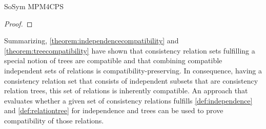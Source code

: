 \begin{copiedFrom}{SoSym MPM4CPS}
\begin{proof}
\end{proof}

Summarizing, \autoref{theorem:independencecompatibility} and \autoref{theorem:treecompatibility} have shown that consistency relation sets fulfilling a special notion of trees are compatible and that combining compatible independent sets of relations is compatibility-preserving.
In consequence, having a consistency relation set that consists of independent subsets that are consistency relation trees, this set of relations is inherently compatible.
An approach that evaluates whether a given set of consistency relations fulfills \autoref{def:independence} and \autoref{def:relationtree} for independence and trees can be used to prove compatibility of those relations.


\end{copiedFrom}
